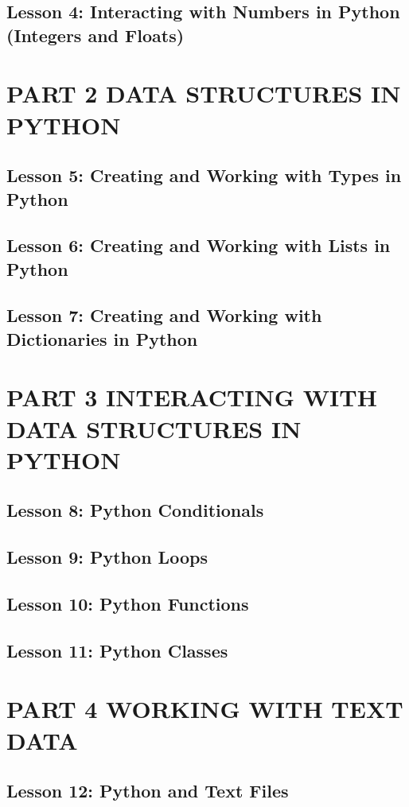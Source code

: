 \documentclass[11pt]{article}
\begin{document}
\subsection{Lesson 4: Interacting with Numbers in Python (Integers and Floats)}
\label{sec:org7658289}
\section{PART 2 DATA STRUCTURES IN PYTHON}
\label{sec:org3ee2322}
\subsection{Lesson 5: Creating and Working with Types in Python}
\label{sec:orgea89f6d}
\subsection{Lesson 6: Creating and Working with Lists in Python}
\label{sec:org3f55912}
\subsection{Lesson 7: Creating and Working with Dictionaries in Python}
\label{sec:orgf71cbe4}
\section{PART 3 INTERACTING WITH DATA STRUCTURES IN PYTHON}
\label{sec:orgbb8ed9e}
\subsection{Lesson 8: Python Conditionals}
\label{sec:orga58a249}
\subsection{Lesson 9: Python Loops}
\label{sec:org2f1c95a}
\subsection{Lesson 10: Python Functions}
\label{sec:org2a2ef85}
\subsection{Lesson 11: Python Classes}
\label{sec:orgcb7d963}
\section{PART 4 WORKING WITH TEXT DATA}
\label{sec:org16cd706}
\subsection{Lesson 12: Python and Text Files}
\label{sec:org96ea863}
\end{document}
